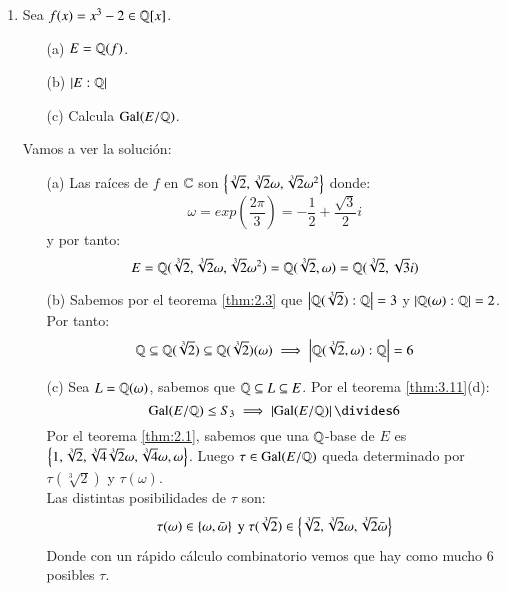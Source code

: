 \begin{eg}
\begin{enumerate}
        \item Sea $f(x) = x^3 - 2 \in \mathbb{Q}[x]$.
        \begin{itemize}
            \item[(a)] $E = \mathbb{Q}(f)$.
            \item[(b)] $\left|E: \mathbb{Q}\right|$
            \item[(c)] Calcula $\mathrm{Gal}(E/\mathbb{Q})$.
        \end{itemize}

        Vamos a ver la solución:
        \begin{itemize}
            \item[(a)] Las raíces de $f$ en $\mathbb{C}$ son $\left\{\sqrt[3]{2}, \sqrt[3]{2} \omega, \sqrt[3]{2} \omega^2\right\}$ donde:
            $$
                \omega = exp\left( \frac{2\pi}{3} \right) = -\frac{1}{2} + \frac{\sqrt 3}{2} i
            $$
            y por tanto:
            $$
                E = \mathbb{Q}(\sqrt[3]{2}, \sqrt[3]{2} \omega, \sqrt[3]{2} \omega^2) = \mathbb{Q}(\sqrt[3]{2}, \omega) = \mathbb{Q}(\sqrt[3]{2}, \sqrt{3} i)
            $$
            \item[(b)] Sabemos por el teorema \ref{thm:2.3} que $\left|\mathbb{Q}(\sqrt[3]{2}):\mathbb{Q}\right| = 3$ y $\left|\mathbb{Q}(\omega):\mathbb{Q}\right| = 2$. Por tanto:
            $$
                \mathbb{Q} \subseteq \mathbb{Q}(\sqrt[3]{2}) \subseteq \mathbb{Q}(\sqrt[3]{2})(\omega) \implies \left|\mathbb{Q}(\sqrt[3]{2}, \omega):\mathbb{Q}\right| = 6
            $$
            \item[(c)] Sea $L = \mathbb{Q}(\omega)$, sabemos que $\mathbb{Q} \subseteq L \subseteq E$. Por el teorema \ref{thm:3.11}(d):
            $$
                \gal(E/\Q) \leq S_3 \implies \vabs{\gal(E/\Q)} \divides 6
            $$
            Por el teorema \ref{thm:2.1}, sabemos que una $\mathbb{Q}$-base de $E$ es $\left\{1, \sqrt[3]{2}, \sqrt[3]{4} \sqrt[3]{2} \omega, \sqrt[3]{4} \omega,  \omega\right\}$. Luego $\tau \in \mathrm{Gal}(E/\mathbb{Q})$ queda determinado por $\tau(\sqrt[3]{2})$ y $\tau(\omega)$.\\
            Las distintas posibilidades de $\tau$ son:
            $$
                \tau(\omega) \in \left\{\omega, \bar \omega\right\} \text{ y } \tau(\sqrt[3]{2}) \in \left\{\sqrt[3]{2}, \sqrt[3]{2} \omega, \sqrt[3]{2} \bar \omega\right\}
            $$
            Donde con un rápido cálculo combinatorio vemos que hay como mucho $6$ posibles $\tau$.
        \end{itemize}
    \end{enumerate}
\end{eg}
